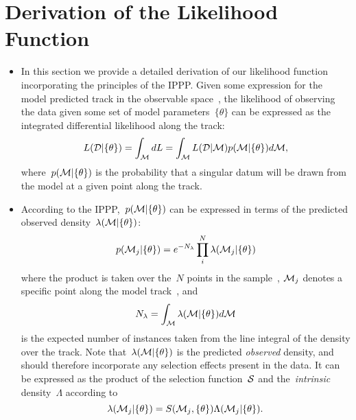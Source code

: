 \documentclass[ms.tex]{subfiles}
\begin{document}
\section{Derivation of the Likelihood Function}
\label{sec:l_derivation}

\begin{itemize}

	\item In this section we provide a detailed derivation of our likelihood
	function incorporating the principles of the IPPP.
	Given some expression for the model predicted track in the observable
	space~, the likelihood of observing the data given some set of
	model parameters~$\{\theta\}$ can be expressed as the integrated
	differential likelihood along the track:
	\begin{equation}
	L(\mathcal{D} | \{\theta\}) = \int_{\mathcal{M}} dL =
	\int_{\mathcal{M}} L(\mathcal{D} | \mathcal{M}) p(\mathcal{M} | \{\theta\})
	d\mathcal{M},
	\end{equation}
	where~$p(\mathcal{M} | \{\theta\})$ is the probability that a singular
	datum will be drawn from the model at a given point along the track.

	\item According to the IPPP,~$p(\mathcal{M} | \{\theta\})$ can be expressed
	in terms of the predicted observed density~$\lambda(\mathcal{M} |
	\{\theta\})$:
	\begin{equation}
	p(\mathcal{M}_j | \{\theta\}) = e^{-N_\lambda}
	\prod_i^N \lambda(\mathcal{M}_j | \{\theta\})
	\end{equation}
	where the product is taken over the~$N$ points in the sample~,
	$_j$ denotes a specific point along the model track~\script{M},
	and
	\begin{equation}
	N_\lambda = \int_{\mathcal{M}} \lambda(\mathcal{M} | \{\theta\}) d\mathcal{M}
	\end{equation}
	is the expected number of instances taken from the line integral of the
	density over the track.
	Note that~$\lambda(\mathcal{M} | \{\theta\})$ is the predicted
	\textit{observed} density, and should therefore incorporate any selection
	effects present in the data.
	It can be expressed as the product of the selection function~$\mathcal{S}$
	and the~\textit{intrinsic} density~$\Lambda$ according to
	\begin{equation}
	\label{eq:lambda_def}
	\lambda(\mathcal{M}_j | \{\theta\}) =
	S(\mathcal{M}_j, \{\theta\})
	\Lambda(\mathcal{M}_j | \{\theta\}).
	\end{equation}


\end{itemize}
\end{document}
